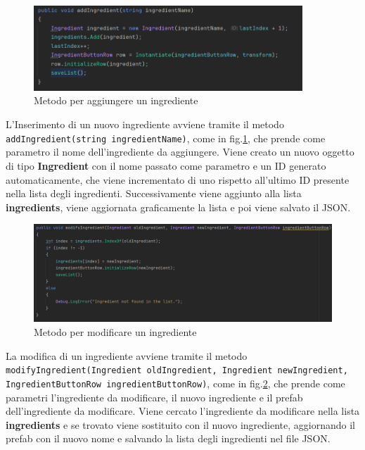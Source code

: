 \begin{figure}[H]
    \centering
    \includegraphics[width=0.9\textwidth,height=\textheight,keepaspectratio]{figures/chapter_1/addIngredient_CODICE.png}
    \caption{Metodo per aggiungere un ingrediente}
    \label{fig:addIngredient}
\end{figure}
L'Inserimento di un nuovo ingrediente avviene tramite il metodo\\ \texttt{addIngredient(string ingredientName)}, come in fig.\ref{fig:addIngredient}, che prende come parametro il nome dell'ingrediente da aggiungere.  Viene creato un nuovo oggetto di tipo \textbf{Ingredient} con il nome passato come parametro e un ID generato automaticamente, che viene incrementato di uno rispetto all'ultimo ID presente nella lista degli ingredienti. Successivamente viene aggiunto alla lista \textbf{ingredients}, viene aggiornata graficamente la lista e poi viene salvato il JSON.
\begin{figure}[H]
    \centering
    \includegraphics[width=1\textwidth,height=\textheight,keepaspectratio]{figures/chapter_1/modifyIngredient_CODICE.png}
    \caption{Metodo per modificare un ingrediente}
    \label{fig:modifyIngredient}
\end{figure}
La modifica di un ingrediente avviene tramite il metodo \\ \texttt{modifyIngredient(Ingredient oldIngredient, Ingredient newIngredient,\\ IngredientButtonRow ingredientButtonRow)}, come in fig.\ref{fig:modifyIngredient}, che prende come parametri l'ingrediente da modificare, il nuovo ingrediente e il prefab dell'ingrediente da modificare. Viene cercato l'ingrediente da modificare nella lista \textbf{ingredients} e se trovato viene sostituito con il nuovo ingrediente, aggiornando il prefab con il nuovo nome e salvando la lista degli ingredienti nel file JSON.
